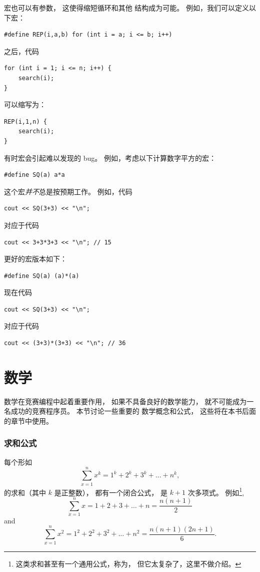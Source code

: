 宏也可以有参数，
这使得缩短循环和其他
结构成为可能。
例如，我们可以定义以下宏：
\begin{lstlisting}
#define REP(i,a,b) for (int i = a; i <= b; i++)
\end{lstlisting}
之后，代码
\begin{lstlisting}
for (int i = 1; i <= n; i++) {
    search(i);
}
\end{lstlisting}
可以缩写为：
\begin{lstlisting}
REP(i,1,n) {
    search(i);
}
\end{lstlisting}

有时宏会引起难以发现的 bug。
例如，考虑以下计算数字平方的宏：
\begin{lstlisting}
#define SQ(a) a*a
\end{lstlisting}
这个宏\emph{并不}总是按预期工作。
例如，代码
\begin{lstlisting}
cout << SQ(3+3) << "\n";
\end{lstlisting}
对应于代码
\begin{lstlisting}
cout << 3+3*3+3 << "\n"; // 15
\end{lstlisting}

更好的宏版本如下：
\begin{lstlisting}
#define SQ(a) (a)*(a)
\end{lstlisting}
现在代码
\begin{lstlisting}
cout << SQ(3+3) << "\n";
\end{lstlisting}
对应于代码
\begin{lstlisting}
cout << (3+3)*(3+3) << "\n"; // 36
\end{lstlisting}


\section{数学}

数学在竞赛编程中起着重要作用，
如果不具备良好的数学能力，
就不可能成为一名成功的竞赛程序员。
本节讨论一些重要的
数学概念和公式，
这些将在本书后面的章节中使用。

\subsubsection{求和公式}

每个形如
\[\sum_{x=1}^n x^k = 1^k+2^k+3^k+\ldots+n^k,\]
的求和（其中 $k$ 是正整数），
都有一个闭合公式，
是 $k+1$ 次多项式。
例如\footnote{
这类求和甚至有一个通用公式，称为，
但它太复杂了，这里不做介绍。},
\[\sum_{x=1}^n x = 1+2+3+\ldots+n = \frac{n(n+1)}{2}\]
and
\[\sum_{x=1}^n x^2 = 1^2+2^2+3^2+\ldots+n^2 = \frac{n(n+1)(2n+1)}{6}.\]

